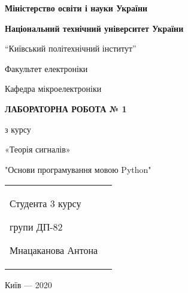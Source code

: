 \documentclass[a4paper,12pt]{article}
\begin{document}
\pagestyle{empty}
\begin{center}
   \begin{center} 
   \large{\textbf{Міністерство освіти і науки України} \par 
   \textbf{Національний технічний університет України}}\par
	“Київський політехнічний інститут”\par
	 Факультет електроніки\par
    	Кафедра мікроелектроніки\par
    \end{center}
    \vspace{4cm}
    
   	{\bfseries ЛАБОРАТОРНА РОБОТА № 1\par}
        \vspace{1cm}
        \large
        {
    	з курсу\par
    	«Теорія сигналів» \par
      	"Основи програмування мовою Python" \par  
	}
	\end{center}

       \vspace{7cm}
       \begin{tabularx}{\textwidth}{Xr}
        \flushright
           \begin{large} 
        Студента 3 курсу\par
 	групи ДП-82\par
	Мнацаканова Антона\par
	 \end{large}
	\end{tabularx}
   
   \vfill
   \begin{center}
    {Київ} --- 2020
    \end{center}
    \newpage
\end{document}
